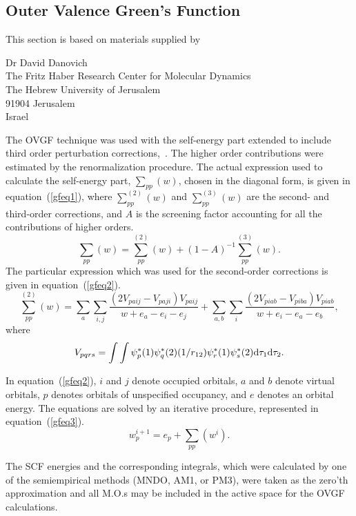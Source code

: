 \subsection{Outer Valence Green's Function}\label{gf}
This section is based on materials supplied by
\begin{center}Dr David Danovich\\The Fritz Haber Research Center for 
Molecular Dynamics\\ The Hebrew University of Jerusalem\\ 91904 Jerusalem\\
Israel \end{center}

The OVGF technique was used with the self-energy part extended to include
third order perturbation corrections,~\cite{gf1}.  The higher order contributions
were estimated by the renormalization procedure.  The actual expression used to
calculate the self-energy part, $\sum_{pp}(w)$, chosen in the diagonal form,
is given in equation~(\ref{gfeq1}), where $\sum_{pp}^{(2)}(w)$ and $\sum_{pp}^{(3)}(w)$ are
the second- and third-order corrections, and $A$ is the screening factor accounting
for all the contributions of higher orders.
\begin{equation}\label{gfeq1}
\sum_{pp}(w) = \sum_{pp}^{(2)}(w)+(1-A)^{-1}\sum_{pp}^{(3)}(w).
\end{equation}
The particular expression which was used for the second-order corrections is given in
equation~(\ref{gfeq2}).
\begin{equation}\label{gfeq2}
\sum_{pp}^{(2)}(w) = \sum_a\sum_{i,j}\frac{(2V_{paij}-V_{paji})V_{paij}}{w+e_a-e_i-e_j}
+\sum_{a,b}\sum_i\frac{(2V_{piab}-V_{piba})V_{piab}}{w+e_i-e_a-e_b},
\end{equation}
where
$$
V_{pqrs} = \int\int\psi_p^*(1)\psi_q^*(2)(1/r_{12})\psi_r^*(1)\psi_s^*(2){\rm d}\tau_1{\rm d}\tau_2.
$$

In equation~(\ref{gfeq2}), $i$ and $j$ denote occupied orbitals, $a$ and $b$
denote virtual orbitals, $p$ denotes orbitals of unspecified occupancy, and
$e$  denotes an orbital energy. The equations are solved by an iterative
procedure, represented in  equation~(\ref{gfeq3}).
\begin{equation}\label{gfeq3}
w_p^{i+1}=e_p+\sum_{pp}(w^i).
\end{equation}

The SCF energies and the corresponding integrals, which were calculated by one
of the semiempirical methods (MNDO, AM1, or PM3), were taken as the zero'th
approximation and all M.O.s may be included in the active space for the OVGF
calculations.

